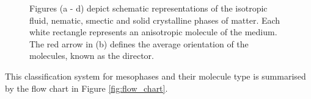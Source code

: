 \begin{figure}
\begin{center}
\hspace{0.5cm}
\hspace{0.5cm}
\hspace{0.5cm}
\hspace{0.5cm}
\end{center}
\caption[Schematic depiction of various liquid crystalline phases]{\label{fig:phases}Figures (a - d) depict schematic representations of the isotropic fluid, nematic, smectic and solid crystalline phases of matter. Each white rectangle represents an anisotropic molecule of the medium. The red arrow in (b) defines the average orientation of the molecules, known as the director.}
\end{figure}

This classification system for mesophases and their molecule type is summarised by the flow chart in Figure \ref{fig:flow_chart}.

